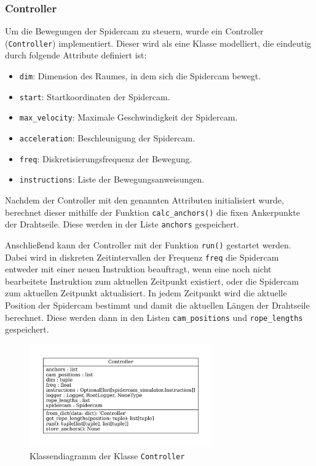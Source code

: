 \subsubsection{Controller}
\label{sssec:controller}

Um die Bewegungen der Spidercam zu steuern, wurde ein Controller (\texttt{Controller}) implementiert.
Dieser wird als eine Klasse modelliert, die eindeutig durch folgende Attribute definiert ist:
\begin{itemize}
    \item \texttt{dim}: Dimension des Raumes, in dem sich die Spidercam bewegt.
    \item \texttt{start}: Startkoordinaten der Spidercam.
    \item \texttt{max\_velocity}: Maximale Geschwindigkeit der Spidercam.
    \item \texttt{acceleration}: Beschleunigung der Spidercam.
    \item \texttt{freq}: Diskretisierungsfrequenz der Bewegung.
    \item \texttt{instructions}: Liste der Bewegungsanweisungen.
\end{itemize}

Nachdem der Controller mit den genannten Attributen initialisiert wurde, berechnet dieser mithilfe der Funktion \texttt{calc\_anchors()} die fixen Ankerpunkte der Drahtseile.
Diese werden in der Liste \texttt{anchors} gespeichert.

Anschließend kann der Controller  mit der Funktion \texttt{run()} gestartet werden.
Dabei wird in diskreten Zeitintervallen der Frequenz \texttt{freq} die Spidercam entweder mit einer neuen Instruktion beauftragt, wenn eine noch nicht bearbeitete Instruktion zum aktuellen Zeitpunkt existiert, oder die Spidercam zum aktuellen Zeitpunkt aktualisiert.
In jedem Zeitpunkt wird die aktuelle Position der Spidercam bestimmt und damit die aktuellen Längen der Drahtseile berechnet.
Diese werden dann in den Listen \texttt{cam\_positions} und \texttt{rope\_lengths} gespeichert.

\begin{figure}[H]
    \centering
    \includegraphics[width=0.7\textwidth]{../python/uml/controller.pdf}
    \caption{Klassendiagramm der Klasse \texttt{Controller}}
    \label{fig:controller}
\end{figure}

